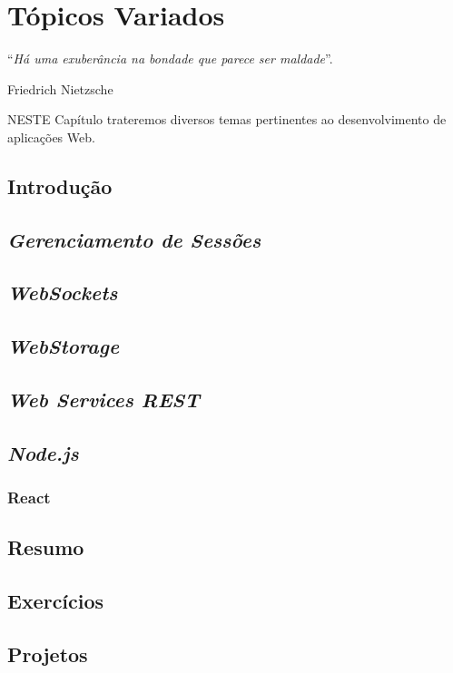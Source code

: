 \chapter{Tópicos Variados}\label{cap:topicosVariados}
\epigraph{``\textit{Há uma exuberância na bondade que parece ser maldade}''.}{Friedrich Nietzsche}

\lettrine[lines=4, lhang=0.1, lraise=0, loversize=0.2, findent=0.1em]{\textcolor{corAzulTema}{N}}{ESTE} Capítulo trateremos diversos temas pertinentes ao desenvolvimento de aplicações Web.

\vfill

\section{Introdução}

\section{\textit{Gerenciamento de Sessões}}

\section{\textit{WebSockets}}

\section{\textit{WebStorage}}

\section{\textit{Web Services REST}}

\section{\textit{Node.js}}

\subsection{React}

\section{Resumo}

\section{Exercícios}

\section{Projetos}
